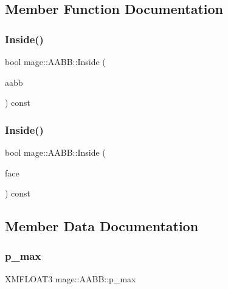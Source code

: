 \subsection{Member Function Documentation}
\hypertarget{structmage_1_1_a_a_b_b_ad1c2ec1aab58a383219ba1082e72b020}{}\label{structmage_1_1_a_a_b_b_ad1c2ec1aab58a383219ba1082e72b020} 
\subsubsection{\texorpdfstring{Inside()}{Inside()}\hspace{0.1cm}{\footnotesize\ttfamily [1/2]}}
{\footnotesize\ttfamily bool mage\+::\+A\+A\+B\+B\+::\+Inside (\begin{DoxyParamCaption}\item[{\hyperlink{structmage_1_1_a_a_b_b}{A\+A\+BB} \&}]{aabb }\end{DoxyParamCaption}) const}

\hypertarget{structmage_1_1_a_a_b_b_ad8b5d30287d5dcb98ad2dfcfb90c5e22}{}\label{structmage_1_1_a_a_b_b_ad8b5d30287d5dcb98ad2dfcfb90c5e22} 
\subsubsection{\texorpdfstring{Inside()}{Inside()}\hspace{0.1cm}{\footnotesize\ttfamily [2/2]}}
{\footnotesize\ttfamily bool mage\+::\+A\+A\+B\+B\+::\+Inside (\begin{DoxyParamCaption}\item[{\hyperlink{structmage_1_1_face}{Face} \&}]{face }\end{DoxyParamCaption}) const}



\subsection{Member Data Documentation}
\hypertarget{structmage_1_1_a_a_b_b_aa5c60af6413a01158acd81d67ebe828c}{}\label{structmage_1_1_a_a_b_b_aa5c60af6413a01158acd81d67ebe828c} 
\subsubsection{\texorpdfstring{p\+\_\+max}{p\_max}}
{\footnotesize\ttfamily X\+M\+F\+L\+O\+A\+T3 mage\+::\+A\+A\+B\+B\+::p\+\_\+max}

